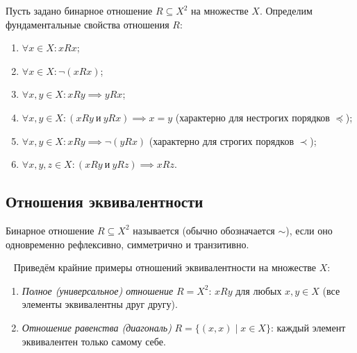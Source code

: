 \begin{definition}
    Пусть задано бинарное отношение $R \subseteq X^2$ на множестве $X$. 
    Определим фундаментальные свойства отношения $R$:
    \begin{enumerate}
        \item {} 
        $\forall x \in X : x R x$;
        \item {} 
        $\forall x \in X : \neg(x R x)$;
        \item {} 
        $\forall x, y \in X : x R y \implies y R x$;
        \item {} 
        $\forall x, y \in X : (x R y \ \text{и} \ y R x) \implies x = y$ 
        (характерно для нестрогих порядков $\preceq$);
        \item {} 
        $\forall x, y \in X : x R y \implies \neg(y R x)$ 
        (характерно для строгих порядков $\prec$);
        \item {} 
        $\forall x, y, z \in X : (x R y \ \text{и} \ y R z) \implies x R z$.
    \end{enumerate}
\end{definition}

\subsection{Отношения эквивалентности}

\begin{definition}
    Бинарное отношение $R \subseteq X^2$ называется  (обычно обозначается $\sim$), если оно одновременно 
    рефлексивно, симметрично и транзитивно.
\end{definition}

\begin{example} ~
    Приведём крайние примеры отношений эквивалентности на множестве $X$:
    \begin{enumerate}
        \item \emph{Полное (универсальное) отношение} $R = X^2$: $x R y$ 
        для любых $x, y \in X$ (все элементы эквивалентны друг другу).
        \item \emph{Отношение равенства (диагональ)} 
        $R = \{(x, x) \mid x \in X\}$: каждый элемент эквивалентен только 
        самому себе.
    \end{enumerate}
\end{example}

